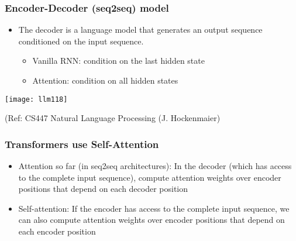 \begin{frame}[fragile]\frametitle{Encoder-Decoder (seq2seq) model}

\begin{itemize}
\item The decoder is a language model that generates an 
output sequence conditioned on the input sequence.
	\begin{itemize}
	\item Vanilla RNN: condition on the last hidden state
	\item Attention: condition on all hidden states
	\end{itemize}	 
\end{itemize}	 

\begin{center}
\texttt{[image: llm118]}

\tiny{(Ref: CS447 Natural Language Processing (J. Hockenmaier)}
\end{center}


\end{frame}


\begin{frame}[fragile]\frametitle{Transformers use Self-Attention}

\begin{itemize}
\item Attention so far (in seq2seq architectures): In the decoder (which has access to the complete input 
sequence), compute attention weights over encoder positions 
that depend on each decoder position
\item Self-attention: If the encoder has access to the complete input sequence, 
we can also compute attention weights over encoder positions 
that depend on each encoder position
\end{itemize}	 

\end{frame}




